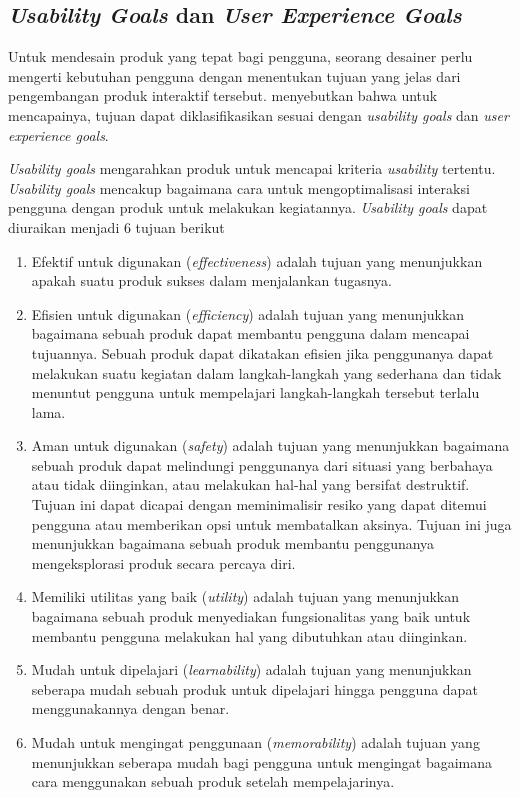 \subsection{\textit{Usability Goals} dan \textit{User Experience Goals}}
\label{subsec:goals}
Untuk mendesain produk yang tepat bagi pengguna, seorang desainer perlu mengerti kebutuhan pengguna dengan menentukan tujuan yang jelas dari pengembangan produk interaktif tersebut. \textcite{PreeceRogersSharp15} menyebutkan bahwa untuk mencapainya, tujuan dapat diklasifikasikan sesuai dengan \textit{usability goals} dan \textit{user experience goals}.



\textit{Usability goals} mengarahkan produk untuk mencapai kriteria \textit{usability} tertentu. \textit{Usability goals} mencakup bagaimana cara untuk mengoptimalisasi interaksi pengguna dengan produk untuk melakukan kegiatannya. \textit{Usability goals} dapat diuraikan menjadi 6 tujuan berikut
\begin{enumerate}
  \item Efektif untuk digunakan (\textit{effectiveness}) adalah tujuan yang menunjukkan apakah suatu produk sukses dalam menjalankan tugasnya.
  \item Efisien untuk digunakan (\textit{efficiency}) adalah tujuan yang menunjukkan bagaimana sebuah produk dapat membantu pengguna dalam mencapai tujuannya. Sebuah produk dapat dikatakan efisien jika penggunanya dapat melakukan suatu kegiatan dalam langkah-langkah yang sederhana dan tidak menuntut pengguna untuk mempelajari langkah-langkah tersebut terlalu lama.
  \item Aman untuk digunakan (\textit{safety}) adalah tujuan yang menunjukkan bagaimana sebuah produk dapat melindungi penggunanya dari situasi yang berbahaya atau tidak diinginkan, atau melakukan hal-hal yang bersifat destruktif. Tujuan ini dapat dicapai dengan meminimalisir resiko yang dapat ditemui pengguna atau memberikan opsi untuk membatalkan aksinya. Tujuan ini juga menunjukkan bagaimana sebuah produk membantu penggunanya mengeksplorasi produk secara percaya diri.
  \item Memiliki utilitas yang baik (\textit{utility}) adalah tujuan yang menunjukkan bagaimana sebuah produk menyediakan fungsionalitas yang baik untuk membantu pengguna melakukan hal yang dibutuhkan atau diinginkan.
  \item Mudah untuk dipelajari (\textit{learnability}) adalah tujuan yang menunjukkan seberapa mudah sebuah produk untuk dipelajari hingga pengguna dapat menggunakannya dengan benar.
  \item Mudah untuk mengingat penggunaan (\textit{memorability}) adalah tujuan yang menunjukkan seberapa mudah bagi pengguna untuk mengingat bagaimana cara menggunakan sebuah produk setelah mempelajarinya.
\end{enumerate}

